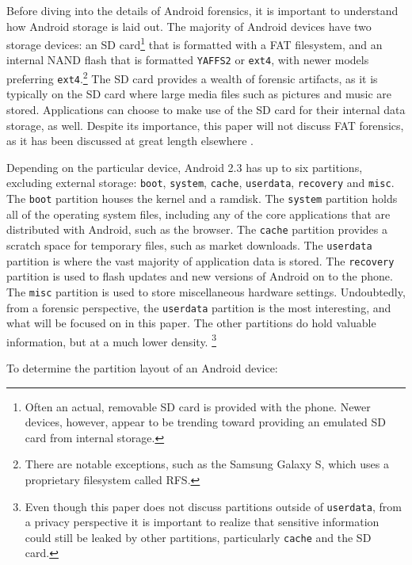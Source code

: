 Before diving into the details of Android forensics, it is important to understand how Android storage is laid out.
The majority of Android devices have two storage devices: an SD card\footnote{Often an actual, removable SD card is provided with
the phone. Newer devices, however, appear to be trending toward providing an emulated SD card from internal storage.} that is
formatted with a FAT filesystem, and an internal NAND flash that is formatted \texttt{YAFFS2} or \texttt{ext4}, with newer models
preferring \texttt{ext4}.\footnote{There are notable exceptions, such as the Samsung Galaxy S, which uses a proprietary filesystem called RFS.} The SD
card provides a wealth of forensic artifacts, as it is typically on the SD card where large media files such as pictures and music
are stored.  Applications can choose to make use of the SD card for their internal data storage, as well.  Despite its importance,
this paper will not discuss FAT forensics, as it has been discussed at great length elsewhere \cite{carrier}. 

Depending on the particular device, Android 2.3 has up to six partitions, excluding external storage: \texttt{boot}, \texttt{system}, \texttt{cache}, \texttt{userdata},
\texttt{recovery} and \texttt{misc}. 
The \texttt{boot} partition houses the kernel and a ramdisk.
The \texttt{system} partition holds all of the operating system files, including any of the core applications that are distributed with Android, such as the browser. 
The \texttt{cache} partition provides a scratch space for temporary files, such as market downloads.
The \texttt{userdata} partition is where the vast majority of application data is stored.
The \texttt{recovery} partition is used to flash updates and new versions of Android on to the phone. 
The \texttt{misc} partition is used to store miscellaneous hardware settings.
Undoubtedly, from a forensic perspective, the \texttt{userdata} partition is the most interesting, and what will be focused on in
this paper. The other partitions do hold valuable information, but at a much lower density.
\footnote{Even though this paper does not discuss partitions outside of \texttt{userdata}, from a privacy perspective it is
important to realize that sensitive information could still be leaked by other partitions, particularly \texttt{cache} and the SD
card.}

To determine the partition layout of an Android device:

